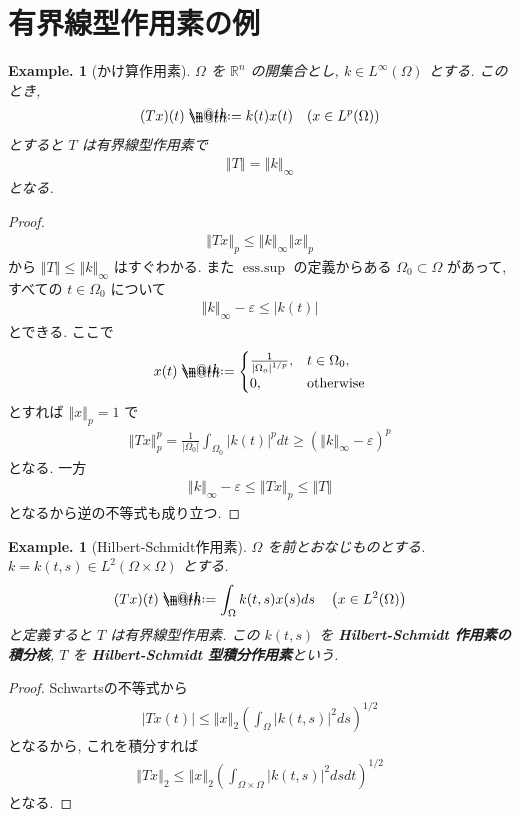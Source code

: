 \documentclass[openany, a4paper, oneside]{jsbook}
\makeatletter
\newcommand*{\defeq}{\mathrel{\rlap{%
\raisebox{0.3ex}{$\m@th\cdot$}}%
\raisebox{-0.3ex}{$\m@th\cdot$}}%
=}
\newcommand{\esssup}{\mathop{\mathrm{ess.sup}}}
\theoremstyle{break}
\theoremstyle{breakdefn}
\newtheorem{ex}[thm]{Example.}
\newcommand{\abs}[1]{\left|#1\right|}
\newcommand{\norm}[1]{\left\Vert#1\right\Vert}
\newcommand{\rbk}[1]{\left (#1\right)}
\newcommand{\bbRn}{\mathbb{R}^n}
\makeatother
\begin{document}
\section{有界線型作用素の例}


\begin{ex}[かけ算作用素]
$\Omega$ を $\bbRn$ の開集合とし,
$k \in L^{\infty}(\Omega)$ とする.
このとき,
\begin{align}
 (Tx)(t)
 \defeq
 k(t)x(t) \quad (x \in L^p(\Omega))
\end{align}
とすると $T$ は有界線型作用素で
\begin{align}
 \norm{T}
 =
 \norm{k}_{\infty}
\end{align}
となる.
\end{ex}
\begin{proof}
\begin{align}
 \norm{T x}_p
 \leq
 \norm{k}_{\infty} \norm{x}_{p}
\end{align}
から $\norm{T} \leq \norm{k}_{\infty}$ はすぐわかる.
また $\esssup$ の定義からある $\Omega_0 \subset \Omega$ があって,
すべての $t \in \Omega_0$ について
\begin{align}
 \norm{k}_{\infty} - \varepsilon
 \leq
 \abs{k(t)}
\end{align}
とできる.
ここで
\begin{align}
 x(t)
 \defeq
 \begin{cases}
  \frac{1}{\abs{\Omega_o}^{1/p}}, & t \in \Omega_0, \\
  0, & \text{otherwise}
 \end{cases}
\end{align}
とすれば $\norm{x}_p = 1$ で
\begin{align}
 \norm{Tx}_p^p
 =
 \frac{1}{\abs{\Omega_0}} \int_{\Omega_0} \abs{k(t)}^p dt
 \geq
 (\norm{k}_{\infty} - \varepsilon)^p
\end{align}
となる.
一方
\begin{align}
 \norm{k}_{\infty} - \varepsilon
 \leq
 \norm{Tx}_p
 \leq
 \norm{T}
\end{align}
となるから逆の不等式も成り立つ.
\end{proof}

\begin{ex}[Hilbert-Schmidt作用素]
$\Omega$ を前とおなじものとする.
$k = k(t, s) \in L^2(\Omega \times \Omega)$
とする.
\begin{align}
 (Tx)(t)
 \defeq
 \int_{\Omega} k(t, s) x(s) ds \quad \rbk{x \in L^2(\Omega)}
\end{align}
と定義すると $T$ は有界線型作用素.
この $k(t, s)$ を \textbf{Hilbert-Schmidt 作用素の積分核},
$T$ を \textbf{Hilbert-Schmidt 型積分作用素}という.
\end{ex}
\begin{proof}
Schwartsの不等式から
\begin{align}
 \abs{Tx(t)}
 \leq
 \norm{x}_2 \rbk{\int_{\Omega} \abs{k(t, s)}^2 ds}^{1/2}
\end{align}
となるから, これを積分すれば
\begin{align}
 \norm{Tx}_2
 \leq
 \norm{x}_2
 \rbk{\int_{\Omega \times \Omega} \abs{k(t, s)}^2 ds dt}^{1/2}
\end{align}
となる.
\end{proof}
\end{document}
